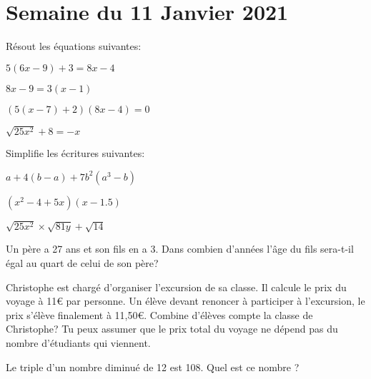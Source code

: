 \section{Semaine du 11 Janvier 2021}

\begin{exercice}
    Résout les équations suivantes:
    \begin{exerciceenumnoeq}
        \item $5(6x - 9) + 3 = 8x - 4$
        \item $8x - 9 = 3(x - 1)$
        \item $(5(x - 7) + 2)(8x - 4) = 0$
        \item $\sqrt{25x^2} + 8 = -x$
    \end{exerciceenumnoeq}
\end{exercice}

\begin{exercice}
    Simplifie les écritures suivantes:
    \begin{exerciceenum}
        \item $a+4(b-a) + 7b^2(a^3 -b)$
        \item $(x^2 -4 + 5x)(x-1.5)$
        \item $\sqrt{25 x^2} \times \sqrt{81 y} + \sqrt{14}$
    \end{exerciceenum}
\end{exercice}

\begin{exercice}
    Un père a 27 ans et son fils en a 3. Dans combien d’années l’âge du fils sera-t-il égal au quart de celui de son père?
\end{exercice}

\begin{exercice}
    Christophe est chargé d’organiser l’excursion de sa classe. Il calcule le prix du voyage à 11€ par personne. Un élève devant renoncer à participer à l'excursion, le prix s’élève finalement à 11,50€. Combine d’élèves compte la classe de Christophe? Tu peux assumer que le prix total du voyage ne dépend pas du nombre d'étudiants qui viennent.
\end{exercice}

\begin{exercice}
    Le triple d’un nombre diminué de 12 est 108. Quel est ce nombre ?
\end{exercice}